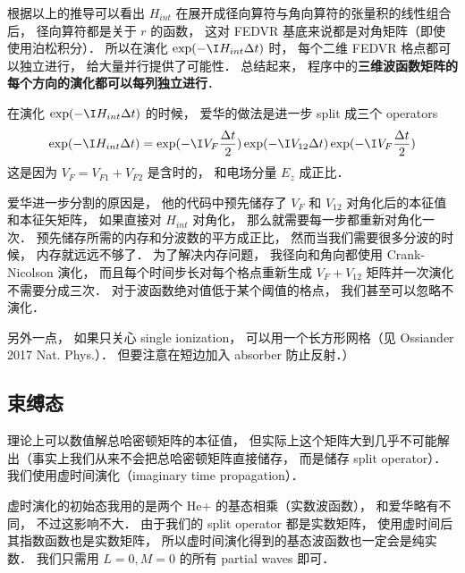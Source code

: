 根据以上的推导可以看出 $H_{int}$ 在展开成径向算符与角向算符的张量积的线性组合后， 径向算符都是关于 $r$ 的函数， 这对 FEDVR 基底来说都是对角矩阵（即使使用泊松积分）． 所以在演化 $\exp(-\I H_{int}\Delta t)$ 时， 每个二维 FEDVR 格点都可以独立进行， 给大量并行提供了可能性． 总结起来， 程序中的\textbf{三维波函数矩阵的每个方向的演化都可以每列独立进行}．

在演化 $\exp(-\I H_{int}\Delta t)$ 的时候， 爱华的做法是进一步 split 成三个 operators
\begin{equation}
\exp(-\I H_{int}\Delta t) = \exp(-\I V_F\frac{\Delta t}{2})   \exp(-\I V_{12} \Delta t) \exp(-\I V_F\frac{\Delta t}{2})
\end{equation}
这是因为 $V_F = V_{F1} + V_{F2}$ 是含时的， 和电场分量 $E_z$ 成正比．

爱华进一步分割的原因是， 他的代码中预先储存了 $V_F$ 和 $V_{12}$ 对角化后的本征值和本征矢矩阵， 如果直接对 $H_{int}$ 对角化， 那么就需要每一步都重新对角化一次． 预先储存所需的内存和分波数的平方成正比， 然而当我们需要很多分波的时候， 内存就远远不够了． 为了解决内存问题， 我径向和角向都使用 Crank-Nicolson 演化， 而且每个时间步长对每个格点重新生成 $V_F + V_{12}$ 矩阵并一次演化不需要分成三次． 对于波函数绝对值低于某个阈值的格点， 我们甚至可以忽略不演化．

另外一点， 如果只关心 single ionization， 可以用一个长方形网格（见 Ossiander 2017 Nat. Phys.）． 但要注意在短边加入 absorber 防止反射．）

\subsection{束缚态}
理论上可以数值解总哈密顿矩阵的本征值， 但实际上这个矩阵大到几乎不可能解出（事实上我们从来不会把总哈密顿矩阵直接储存， 而是储存 split operator）． 我们使用虚时间演化（imaginary time propagation）．

虚时演化的初始态我用的是两个 He+ 的基态相乘（实数波函数）， 和爱华略有不同， 不过这影响不大． 由于我们的 split operator 都是实数矩阵， 使用虚时间后其指数函数也是实数矩阵， 所以虚时间演化得到的基态波函数也一定会是纯实数．
我们只需用 $L = 0, M = 0$ 的所有 partial waves 即可．
